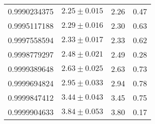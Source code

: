 \begin{table}[t]
\begin{tabular}{cccc}
0.9990234375 & $2.25 \pm 0.015$ & 2.26 & 0.47 \\
0.9995117188 & $2.29 \pm 0.016$ & 2.30 & 0.63 \\
0.9997558594 & $2.33 \pm 0.017$ & 2.33 & 0.62 \\
0.9998779297 & $2.48 \pm 0.021$ & 2.49 & 0.28 \\
0.9999389648 & $2.63 \pm 0.025$ & 2.63 & 0.73 \\
0.9999694824 & $2.95 \pm 0.033$ & 2.94 & 0.78 \\
0.9999847412 & $3.44 \pm 0.043$ & 3.45 & 0.75 \\
0.9999904633 & $3.84 \pm 0.053$ & 3.80 & 0.17 \\
\hline
\end{tabular}
\end{table}

